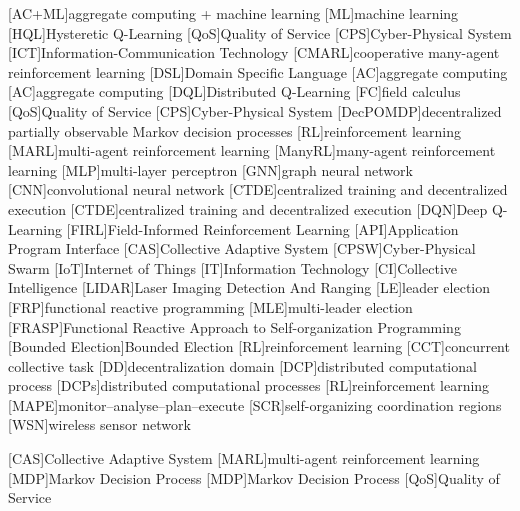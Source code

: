[AC+ML]{aggregate computing + machine learning}
[ML]{machine learning}
[HQL]{Hysteretic Q-Learning}
[QoS]{Quality of Service}
[CPS]{Cyber-Physical System}
[ICT]{Information-Communication Technology}
[CMARL]{cooperative many-agent reinforcement learning}
[DSL]{Domain Specific Language}
[AC]{aggregate computing}
[AC]{aggregate computing}
[DQL]{Distributed Q-Learning}
[FC]{field calculus}
[QoS]{Quality of Service}
[CPS]{Cyber-Physical System}
[DecPOMDP]{decentralized partially observable Markov decision processes}
[RL]{reinforcement learning}
[MARL]{multi-agent reinforcement learning}
[ManyRL]{many-agent reinforcement learning}
[MLP]{multi-layer perceptron}
[GNN]{graph neural network}
[CNN]{convolutional neural network}
[CTDE]{centralized training and decentralized execution}
[CTDE]{centralized training and decentralized execution}
[DQN]{Deep Q-Learning}
[FIRL]{Field-Informed Reinforcement Learning}
[API]{Application Program Interface}
[CAS]{Collective Adaptive System}
[CPSW]{Cyber-Physical Swarm}
[IoT]{Internet of Things}
[IT]{Information Technology}
[CI]{Collective Intelligence}
[LIDAR]{Laser Imaging Detection And Ranging}
[LE]{leader election}
[FRP]{functional reactive programming}
[MLE]{multi-leader election}
[FRASP]{Functional Reactive Approach to Self-organization Programming}
[Bounded Election]{Bounded Election}
[RL]{reinforcement learning}
[CCT]{concurrent collective task}
[DD]{decentralization domain}
[DCP]{distributed computational process}
[DCPs]{distributed computational processes}
[RL]{reinforcement learning}
[MAPE]{monitor--analyse--plan--execute}
[SCR]{self-organizing coordination regions}
[WSN]{wireless sensor network}

[CAS]{Collective Adaptive System}
[MARL]{multi-agent reinforcement learning}
[MDP]{Markov Decision Process}
[MDP]{Markov Decision Process}
[QoS]{Quality of Service}